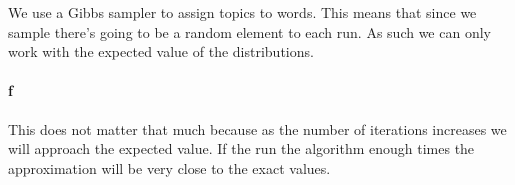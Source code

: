 \documentclass{article}
\begin{document}
We use a Gibbs sampler to assign topics to words. This means that since we
sample there's going to be a random element to each run. As such we can only
work with the expected value of the distributions.

\paragraph{f}

This does not matter that much because as the number of iterations increases we
will approach the expected value. If the run the algorithm enough times the
approximation will be very close to the exact values.
\end{document}
